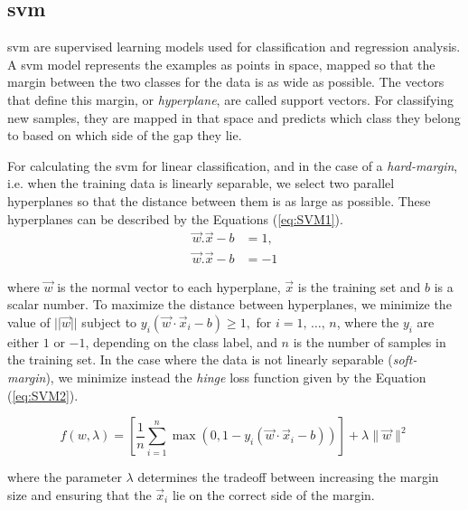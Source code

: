 \subsection{\acl{svm}}
\label{ssec:SuportVectorMachines}

\ac{svm} \cite{cortes1995support} are supervised learning models used for classification and regression analysis. A \ac{svm} model represents the examples as points in space, mapped so that the margin between the two classes for the data is as wide as possible. The vectors that define this margin, or \textit{hyperplane}, are called support vectors. For classifying new samples, they are mapped in that space and predicts which class they belong to based on which side of the gap they lie.

For calculating the \ac{svm} for linear classification, and in the case of a \textit{hard-margin}, i.e. when the training data is linearly separable, we select two parallel hyperplanes so that the distance between them is as large as possible.
These hyperplanes can be described by the Equations (\ref{eq:SVM1}).
\begin{equation}
\label{eq:SVM1}
\begin{split}
\vec{w}.\vec{x}-b&=1, \\
\vec{w}.\vec{x}-b&=-1
\end{split}
\end{equation}

where $\vec{w}$ is the normal vector to each hyperplane, $\vec{x}$ is the training set and $b$ is a scalar number.
To maximize the distance between hyperplanes, we minimize the value of $||\vec{w}||$ subject to ${\displaystyle y_{i}({\vec {w}}\cdot {\vec {x}}_{i}-b)\geq 1,}$ for ${\displaystyle i=1,\,\ldots ,\,n} $, where the $y_{i}$ are either $1$ or $-1$, depending on the class label, and $n$ is the number of samples in the training set.
In the case where the data is not linearly separable (\textit{soft-margin}), we minimize instead the \textit{hinge} loss function given by the Equation (\ref{eq:SVM2}).

\begin{equation}
\label{eq:SVM2}
f(w,\lambda)={\displaystyle \left[{\frac {1}{n}}\sum _{i=1}^{n}\max \left(0,1-y_{i}({\vec {w}}\cdot {\vec {x}}_{i}-b)\right)\right]+\lambda \lVert {\vec {w}}\rVert ^{2}}
\end{equation}

where the parameter $\lambda$ determines the tradeoff between increasing the margin size and ensuring that the ${\vec {x}}_{i}$ lie on the correct side of the margin.

